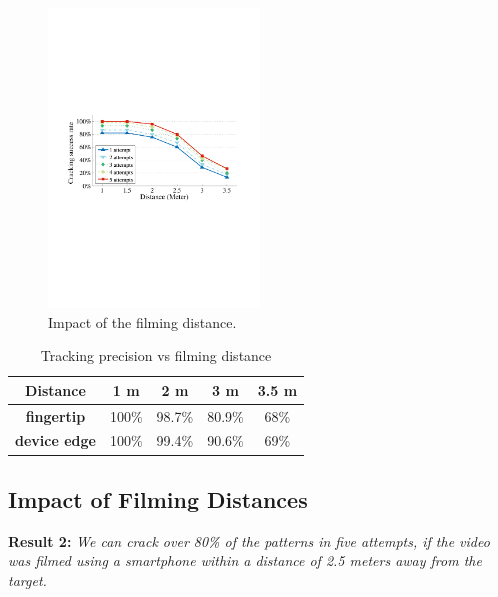         \begin{figure}[t!]
            \centering
            \includegraphics[width=0.5\textwidth]{fig/12.pdf}
            \caption{Impact of the filming distance.}
            \label{fig:fig12}
        \end{figure}
        
        \begin{table}[!t]
            \centering
            \caption{Tracking precision vs filming distance}
            \vspace{-0.2mm}
            \label{tab:tab1}
            \small
            \begin{tabular}{ccccc}
                \toprule
                \textbf{Distance}& 1 m & 2 m & 3 m & 3.5 m \\
                \midrule
                \textbf{fingertip}  & 100\% & 98.7\% & 80.9\% & 68\% \\
                \textbf{device edge} & 100\% & 99.4\% & 90.6\% & 69\% \\
                \bottomrule
            \end{tabular}
            \vspace{-5mm}
        \end{table}

    \subsection{Impact of Filming Distances \label{sec:distances}}


        \noindent \textbf{Result 2:} \emph{We can crack over 80\% of the patterns in five attempts, if the video was filmed using a smartphone within a distance of 2.5 meters away from the target.}

